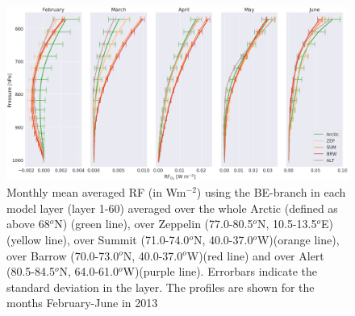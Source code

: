 \begin{figure}[ht]
    \centering
    \includegraphics[width = \linewidth]{Chapter6_Results/images/RF/RF_USE/vert_RF_2013_BE.png}
    \caption{Monthly mean averaged RF (in Wm$^{-2}$) using the BE-branch in each model layer (layer 1-60) averaged over the whole Arctic (defined as above 68$^o$N) (green line), over Zeppelin (77.0-80.5$^o$N, 10.5-13.5$^o$E) (yellow line), over Summit (71.0-74.0$^o$N, 40.0-37.0$^o$W)(orange line), over Barrow (70.0-73.0$^o$N, 40.0-37.0$^o$W)(red line) and over Alert (80.5-84.5$^o$N, 64.0-61.0$^o$W)(purple line). Errorbars indicate the standard deviation in the layer. The profiles are shown for the months February-June in 2013}
    \label{fig:vert_RF_2013}
\end{figure}